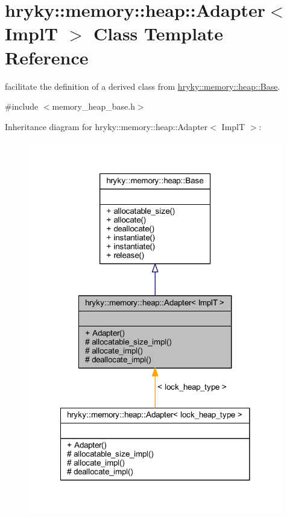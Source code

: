 \hypertarget{classhryky_1_1memory_1_1heap_1_1_adapter}{\section{hryky\-:\-:memory\-:\-:heap\-:\-:Adapter$<$ Impl\-T $>$ Class Template Reference}
\label{classhryky_1_1memory_1_1heap_1_1_adapter}
}


facilitate the definition of a derived class from \hyperlink{classhryky_1_1memory_1_1heap_1_1_base}{hryky\-::memory\-::heap\-::\-Base}.  




{\ttfamily \#include $<$memory\-\_\-heap\-\_\-base.\-h$>$}



Inheritance diagram for hryky\-:\-:memory\-:\-:heap\-:\-:Adapter$<$ Impl\-T $>$\-:
\nopagebreak
\begin{figure}[H]
\begin{center}
\leavevmode
\includegraphics[width=314pt]{classhryky_1_1memory_1_1heap_1_1_adapter__inherit__graph}
\end{center}
\end{figure}
